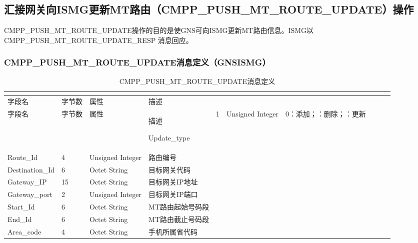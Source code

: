 \documentclass[11pt]{book} %
\begin{document}
\subsection{汇接网关向ISMG更新MT路由（CMPP\_PUSH\_MT\_ROUTE\_UPDATE）操作}


CMPP\_PUSH\_MT\_ROUTE\_UPDATE操作的目的是使GNS可向ISMG更新MT路由信息。ISMG以CMPP\_PUSH\_MT\_ROUTE\_UPDATE\_RESP 消息回应。



%
%
%
%
%



\subsubsection{CMPP\_PUSH\_MT\_ROUTE\_UPDATE消息定义（GNS\textrightarrow ISMG）}



\begin{longtable}{|m{90pt}|m{35pt}|m{80pt}|m{200pt}|}
\tabularnewline\hline
字段名&字节数&属性&描述
\endhead

\caption{CMPP\_PUSH\_MT\_ROUTE\_UPDATE消息定义}\\
\hline
字段名&字节数&属性&描述
\endfirsthead

\endfoot

\endlastfoot

\hline
Update\_type&1&Unsigned Integer&0：添加；：删除；：更新\\
\hline
Route\_Id&4&Unsigned Integer&路由编号\\
\hline
Destination\_Id&6&Octet String&目标网关代码\\
\hline
Gateway\_IP&15&Octet String&目标网关IP地址\\
\hline
Gateway\_port&2&Unsigned Integer&目标网关IP端口\\
\hline
Start\_Id&6&Octet String&MT路由起始号码段\\
\hline
End\_Id&6&Octet String&MT路由截止号码段\\
\hline
Area\_code&4&Octet String&手机所属省代码\\
\hline
\end{longtable}
\end{document}
